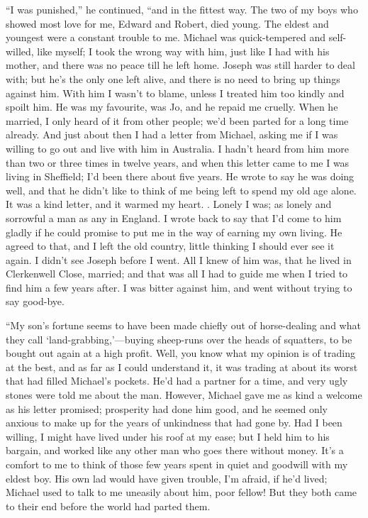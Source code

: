 {}``I was punished,'' he continued, ``and in the fittest way. The two of
my boys who showed most love for me, Edward and Robert, died young. The
eldest and youngest were a constant trouble to me. Michael was
quick-tempered and self-willed, like myself; I took the wrong way with
him, just like I had with his mother, and there was no peace till he
left home. Joseph was still harder to deal with; but he's the only one
left alive, and there is no need to bring up things against him. With
him I wasn't to blame, unless I treated him too kindly and spoilt him.
He was my favourite, was Jo, and he repaid me cruelly. When he married,
I only heard of it from other people; we'd been parted for a long time
already. And just about then I had a letter from Michael, asking me if I
was willing to go out and live with him in Australia. I hadn't heard
from him more than two or three times in twelve years, and when this
letter came to me I was living in Sheffield; I'd been there about five
years. He wrote to say he was {}doing well, and that he didn't like to
think of me being left to spend my old age alone. It was a kind letter,
and it warmed my heart. . Lonely I was; as lonely and sorrowful a man as
any in England. I wrote back to say that I'd come to him gladly if he
could promise to put me in the way of earning my own living. He agreed
to that, and I left the old country, little thinking I should ever see
it again. I didn't see Joseph before I went. All I knew of him was, that
he lived in Clerkenwell Close, married; and that was all I had to guide
me when I tried to find him a few years after. I was bitter against him,
and went without trying to say good-bye.

``My son's fortune seems to have been made chiefly out of horse-dealing
and what they call `land-grabbing,'---buying sheep-runs over the heads
of squatters, to be bought out again at a high profit. Well, you know
what my opinion is of trading at the best, and as far as I could
understand it, it was trading at about its worst that had filled
Michael's pockets. He'd had a partner for {}a time, and very ugly stones
were told me about the man. However, Michael gave me as kind a welcome
as his letter promised; prosperity had done him good, and he seemed only
anxious to make up for the years of unkindness that had gone by. Had I
been willing, I might have lived under his roof at my ease; but I held
him to his bargain, and worked like any other man who goes there without
money. It's a comfort to me to think of those few years spent in quiet
and goodwill with my eldest boy. His own lad would have given trouble,
I'm afraid, if he'd lived; Michael used to talk to me uneasily about
him, poor fellow! But they both came to their end before the world had
parted them.

